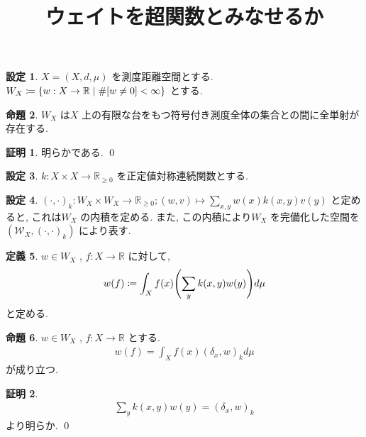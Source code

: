 \documentclass[10pt, fleqn, label-section=none]{bxjsarticle}
\title{ウェイトを超関数とみなせるか}
\date{}
\author{}
\theoremstyle{definition}
\newtheorem{dfn}{定義}[section]
\newtheorem{prop}[dfn]{命題}
\newtheorem{setting}[dfn]{設定}
\newtheorem*{pf*}{証明}
\newcommand{\paren}[1]{\mleft( #1\mright )}
\newcommand{\cbra}[1]{\mleft\{#1\mright\}}
\renewcommand{\;}{\, ; \,}
\begin{document}
\maketitle

\section{}

\begin{setting}$X = (X, d, \mu)$ を測度距離空間とする. $W_X \coloneqq \cbra{w: X \rightarrow \mathbb R \mid \# [w \neq 0] < \infty}$ とする. 

\end{setting}



\begin{prop}$W_X$ は$X$ 上の有限な台をもつ符号付き測度全体の集合との間に全単射が存在する. 

\end{prop}
\begin{pf*}
明らかである. 
\qed
\end{pf*}

\begin{setting}$k: X \times X \rightarrow \mathbb R_{\geq 0}$ を正定値対称連続関数とする. 

\end{setting}

\begin{setting}$(\cdot, \cdot)_k : W_X \times W_X \rightarrow \mathbb R_{\geq 0} ; (w, v) \mapsto \sum_{x, y} w(x)k(x, y)v(y)$ と定めると, これは$W_X$ の内積を定める.  また, この内積により$W_X$ を完備化した空間を$(\mathcal W_X, (\cdot, \cdot)_k)$ により表す. 
\end{setting}

\begin{dfn}$w \in W_X$ , $f: X \rightarrow \mathbb R$ に対して, 
\begin{align*} w(f) \coloneqq \int_X f(x) \paren{\sum_y k(x, y) w(y)} d\mu  \end{align*}
と定める. 
\end{dfn}

\begin{prop}$w \in W_X$ , $f: X \rightarrow \mathbb R$ とする. 
\begin{align*} w(f) = \int_X f(x) (\delta_x, w)_k d\mu  \end{align*}
が成り立つ. 

\end{prop}
\begin{pf*}
\begin{align*} \sum_y k(x, y) w(y) = (\delta_x, w)_k \end{align*}
より明らか. 
\qed
\end{pf*}
\end{document}
